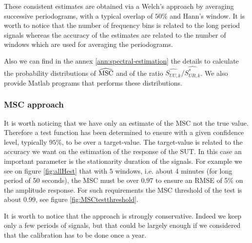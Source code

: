 These consistent estimates are obtained via a Welch's approach by averaging successive periodograms, with a typical overlap of $50\%$ and Hann's window. It is worth to notice that the number of frequency  bins is related to the long period signals whereas the accuracy of the estimates are related to the number of windows which are used for averaging the periodograms.


Also we can find in the annex \ref{ann:spectral-estimation} the details to calculate the probability distributions of $\widehat{\mathrm{MSC}}$ and of the ratio $\widehat{S_{UU,k}}/\widehat{S^*_{UR,k}}$. We also provide Matlab programs that performs these distributions. 

\subsubsection{MSC approach}

It is worth noticing that we have only an estimate of the MSC not the true value. Therefore a test function has been determined to ensure with a given confidence level, typically $95\%$, to be over a target-value. The target-value is related to the accuracy we want on the estimation of the response of the SUT. In this case an important parameter is the  stationarity duration of the signals. For example we see on figure \ref{fig:allHest} that with $5$ windows, i.e. about 4 minutes (for long period of 50 seconds), the MSC must be over $0.97$ to ensure an RMSE of 5\% on the amplitude response. For such requirements the MSC threshold of the test is about $0.99$, see figure \ref{fig:MSCtestthreshold}.

It is worth to notice that the approach is strongly conservative. Indeed we keep only a few periods of signals, but that could be largely enough if we considered that the calibration has to be done once a year.





